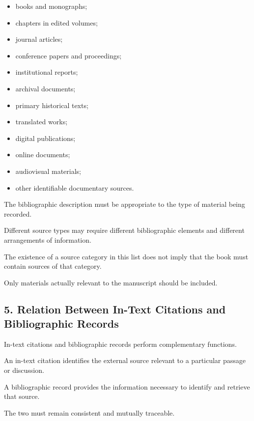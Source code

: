 \begin{itemize}
    \item books and monographs;
    \item chapters in edited volumes;
    \item journal articles;
    \item conference papers
    and proceedings;
    \item institutional reports;
    \item archival documents;
    \item primary historical texts;
    \item translated works;
    \item digital publications;
    \item online documents;
    \item audiovisual materials;
    \item other identifiable
    documentary sources.
\end{itemize}

The bibliographic description
must be appropriate to the
type of material being recorded.

Different source types may
require different bibliographic
elements and different
arrangements of information.

The existence of a source
category in this list does
not imply that the book
must contain sources of
that category.

Only materials actually
relevant to the manuscript
should be included.


\subsection*{5. Relation Between In-Text
Citations and Bibliographic Records}

In-text citations and
bibliographic records
perform complementary
functions.

An in-text citation identifies
the external source relevant
to a particular passage
or discussion.

A bibliographic record
provides the information
necessary to identify
and retrieve that source.

The two must remain
consistent and mutually
traceable.

